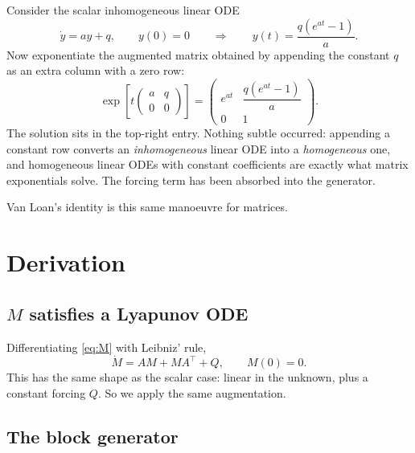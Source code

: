 \documentclass[11pt]{article}
\begin{document}
Consider the scalar inhomogeneous linear ODE
\begin{equation}
\dot y = ay + q,\qquad y(0)=0
\qquad\Longrightarrow\qquad
y(t) = \frac{q\left(e^{at}-1\right)}{a}.
\end{equation}
Now exponentiate the augmented matrix obtained by appending the constant $q$ as an extra
column with a zero row:
\begin{equation}
\exp\!\left[t\begin{pmatrix}a & q\\ 0 & 0\end{pmatrix}\right]
=\begin{pmatrix} e^{at} & \dfrac{q\left(e^{at}-1\right)}{a}\\[2ex] 0 & 1\end{pmatrix}.
\label{eq:scalar}
\end{equation}
The solution sits in the top-right entry. Nothing subtle occurred: appending a constant row
converts an \emph{inhomogeneous} linear ODE into a \emph{homogeneous} one, and homogeneous
linear ODEs with constant coefficients are exactly what matrix exponentials solve. The
forcing term has been absorbed into the generator.

Van Loan's identity is this same manoeuvre for matrices.

\section{Derivation}

\subsection{$M$ satisfies a Lyapunov ODE}

Differentiating \eqref{eq:M} with Leibniz' rule,
\begin{equation}
\dot M = A M + M A^{\!\top} + Q, \qquad M(0)=0.
\label{eq:lyap}
\end{equation}
This has the same shape as the scalar case: linear in the unknown, plus a constant forcing
$Q$. So we apply the same augmentation.

\subsection{The block generator}
\end{document}
